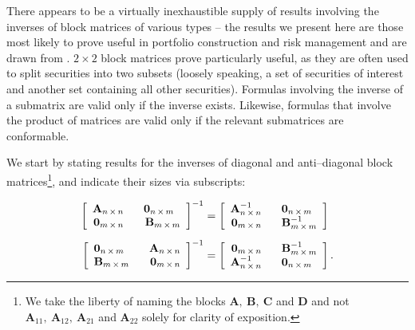 \documentclass[graybox,envcountchap,sectrefs]{svmono}\usepackage[]{graphicx}\usepackage[]{xcolor}
\begin{document}
\begin{appendices}
There appears to be a virtually inexhaustible supply of results involving
the inverses of block matrices of various types -- the results we
present here are those most likely to prove useful in portfolio construction
and risk management and are drawn from \citet{LuShiou2002}. $2\times2$
block matrices prove particularly useful, as they are often used to
split securities into two subsets (loosely speaking, a set of securities
of interest and another set containing all other securities). Formulas
involving the inverse of a submatrix are valid only if the inverse
exists. Likewise, formulas that involve the product of matrices are
valid only if the relevant submatrices are conformable.

We start by stating results for the inverses of diagonal and anti--diagonal
block matrices\footnote{We take the liberty of naming the blocks $\mathrm{\mathbf{A}},\ \mathbf{B},\ \mathrm{\mathbf{C}}$
and $\mathrm{\mathbf{D}}$ and not $\mathrm{\mathbf{A}}_{11},\ \mathrm{\mathbf{A}}_{12},\ \mathrm{\mathbf{A}}_{21}$
and $\mathrm{\mathbf{A}}_{22}$ solely for clarity of exposition.}, and indicate their sizes via subscripts:

\begin{subequations}
\begin{align}
\left[\begin{array}{rl}
\mathbf{A}_{n\,\times\,n} & \hphantom{-}\mathbf{0}_{n\,\times\,m}\\
\mathbf{0}_{m\,\times\,n} & \boldsymbol{\hphantom{-}\mathbf{B}}_{m\,\times\,m}
\end{array}\right]^{-1} & =\left[\begin{array}{rl}
\mathbf{A}_{n\,\times\,n}^{-1} & \hphantom{-}\mathbf{0}_{n\,\times\,m}\\
\mathbf{0}_{m\,\times\,n} & \hphantom{-}\mathbf{B}_{m\,\times\,m}^{-1}
\end{array}\right]\label{eq:SpecialInverse1a}\\[0.5em]
\left[\begin{array}{lr}
\mathbf{0}_{n\,\times\,m} & \hphantom{-}\mathbf{A}_{n\,\times\,n}\\
\mathbf{B}_{m\,\times\,m} & \hphantom{-}\mathbf{0}_{m\,\times\,n}
\end{array}\right]^{-1} & =\left[\begin{array}{rl}
\mathbf{0}_{m\,\times\,n} & \hphantom{-}\mathbf{B}_{m\,\times\,m}^{-1}\\
\mathbf{A}_{n\,\times\,n}^{-1} & \hphantom{-}\mathbf{0}_{n\,\times\,m}
\end{array}\right].\label{eq:SpecialInverese1b}
\end{align}
\end{subequations}


\end{appendices}
\end{document}
